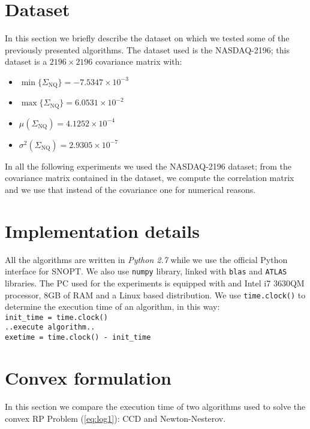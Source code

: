 \section{Dataset}
In this section we briefly describe the dataset on which we tested some of the previously presented algorithms. The dataset used is the NASDAQ-2196\footnotemark[1]; this dataset is a $2196 \times 2196$ covariance matrix with:
\begin{itemize}
\item $\min \{\Sigma_{\text{NQ}}\} = -7.5347 \times 10^{-3} $
\item $\max \{\Sigma_{\text{NQ}}\} = 6.0531 \times 10^{-2} $
\item $\mu(\Sigma_{\text{NQ}}) = 4.1252 \times 10^{-4} $
\item $\sigma^2(\Sigma_{\text{NQ}}) = 2.9305 \times 10^{-7}$
\end{itemize}
In all the following experiments we used the NASDAQ-2196 dataset; from the covariance matrix contained in the dataset, we compute the correlation matrix and we use that instead of the covariance one for numerical reasons.

\section{Implementation details}
All the algorithms are written in \textit{Python 2.7} while we use the official Python interface for SNOPT. We also use \texttt{numpy} library, linked with \texttt{blas} and \texttt{ATLAS} libraries. The PC used for the experiments is equipped with and Intel i7 3630QM processor, 8GB of RAM and a Linux based distribution. We use \texttt{time.clock()} to determine the execution time of an algorithm, in this way:\vspace{0.3em}\\

\texttt{init\_time = time.clock()}\\
\texttt{..execute algorithm..}\\
\texttt{exetime = time.clock() - init\_time}

\section{Convex formulation}
In this section we compare the execution time of two algorithms used to solve the convex RP Problem (\ref{eq:log1}): CCD and Newton-Nesterov.
